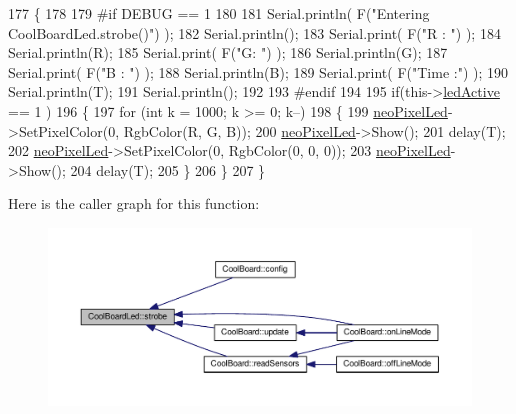 \begin{DoxyCode}
177 \{
178 
179 \textcolor{preprocessor}{#if DEBUG == 1}
180 
181     Serial.println( F(\textcolor{stringliteral}{"Entering CoolBoardLed.strobe()"}) );
182     Serial.println();
183     Serial.print( F(\textcolor{stringliteral}{"R : "}) );
184     Serial.println(R);
185     Serial.print( F(\textcolor{stringliteral}{"G: "}) );
186     Serial.println(G);
187     Serial.print( F(\textcolor{stringliteral}{"B : "}) );
188     Serial.println(B);
189     Serial.print( F(\textcolor{stringliteral}{"Time :"}) );
190     Serial.println(T);
191     Serial.println();
192 
193 \textcolor{preprocessor}{#endif  }
194 
195     \textcolor{keywordflow}{if}(this->\hyperlink{classCoolBoardLed_a5f17c135516fcf4b44ea8a096ba0177a}{ledActive} == 1 )
196     \{   
197         \textcolor{keywordflow}{for} (\textcolor{keywordtype}{int} k = 1000; k >= 0; k--) 
198         \{
199             \hyperlink{classCoolBoardLed_ac2c13fa462a010cd9242bf297c013923}{neoPixelLed}->SetPixelColor(0, RgbColor(R, G, B));
200             \hyperlink{classCoolBoardLed_ac2c13fa462a010cd9242bf297c013923}{neoPixelLed}->Show();
201             delay(T);
202             \hyperlink{classCoolBoardLed_ac2c13fa462a010cd9242bf297c013923}{neoPixelLed}->SetPixelColor(0, RgbColor(0, 0, 0));
203             \hyperlink{classCoolBoardLed_ac2c13fa462a010cd9242bf297c013923}{neoPixelLed}->Show();
204             delay(T);
205         \}
206     \}
207 \}
\end{DoxyCode}
Here is the caller graph for this function\+:
\nopagebreak
\begin{figure}[H]
\begin{center}
\leavevmode
\includegraphics[width=350pt]{classCoolBoardLed_ad5f0de4c628cbfbf49896042831c64ad_icgraph}
\end{center}
\end{figure}
\mbox{\label{classCoolBoardLed_a30fadd4cbec17ceea428bf7a32207e87}} 
